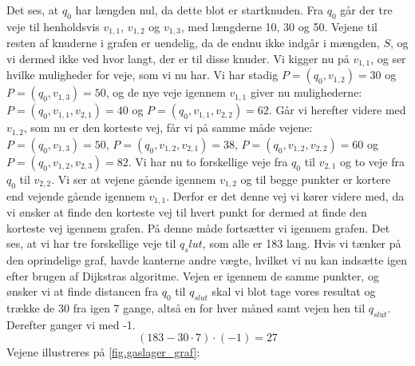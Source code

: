 Det ses, at $q_0$ har længden nul, da dette blot er startknuden. Fra $q_0$ går der tre veje til henholdsvis $v_{1,1}$, $v_{1,2}$ og $v_{1,3}$, med længderne 10, 30 og 50. Vejene til resten af knuderne i grafen er uendelig, da de endnu ikke indgår i mængden, $S$, og vi dermed ikke ved hvor langt, der er til disse knuder. Vi kigger nu på $v_{1,1}$, og ser hvilke muligheder for veje, som vi nu har. Vi har stadig $P=(q_{0},v_{1,2})=30$ og $P=(q_{0},v_{1,3})=50$, og de nye veje igennem $v_{1,1}$ giver nu mulighederne: $P=(q_{0},v_{1,1},v_{2,1})=40$ og $P=(q_{0},v_{1,1},v_{2,2})=62$. Går vi herefter videre med $v_{1,2}$, som nu er den korteste vej, får vi på samme måde vejene: $P=(q_{0},v_{1,3})=50$, $P=(q_{0},v_{1,2},v_{2,1})=38$, $P=(q_{0},v_{1,2},v_{2,2})=60$ og $P=(q_{0},v_{1,2},v_{2,3})=82$. Vi har nu to forskellige veje fra $q_{0}$ til $v_{2,1}$ og to veje fra $q_{0}$ til $v_{2,2}$. Vi ser at vejene gående igennem $v_{1,2}$ og til begge punkter er kortere end vejende gående igennem $v_{1,1}$. Derfor er det denne vej vi kører videre med, da vi ønsker at finde den korteste vej til hvert punkt for dermed at finde den korteste vej igennem grafen. På denne måde fortsætter vi igennem grafen. Det ses, at vi har tre forskellige veje til $q_slut$, som alle er 183 lang. Hvis vi tænker på den oprindelige graf, havde kanterne andre vægte, hvilket vi nu kan indsætte igen efter brugen af Dijkstras algoritme. Vejen er igennem de samme punkter, og ønsker vi at finde distancen fra $q_{0}$ til $q_{slut}$ skal vi blot tage vores resultat og trække de 30 fra igen 7 gange, altså en for hver måned samt vejen hen til $q_{slut}$. Derefter ganger vi med -1.
\begin{equation}
(183-30 \cdot 7) \cdot (-1) = 27
\end{equation}
Vejene illustreres på \autoref{fig.gaslager_graf}:



